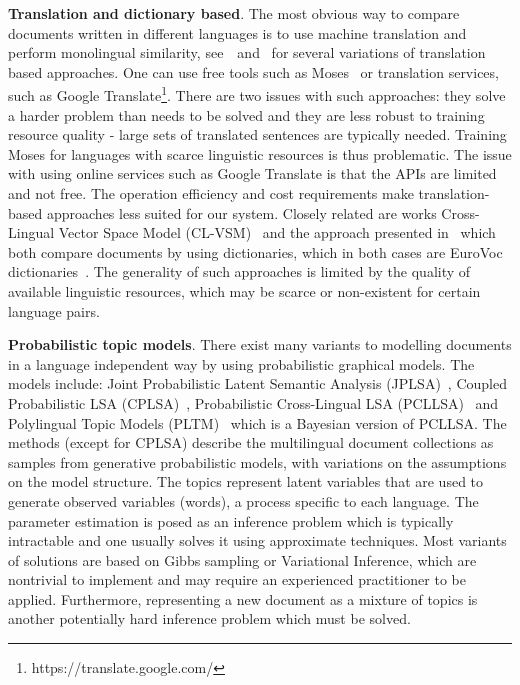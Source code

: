 \textbf{Translation and dictionary based}. The most obvious way to compare documents written in different languages is to use machine translation and perform monolingual similarity, see~\cite{multilingualBook}~and~\cite{plagiarism} for several variations of translation based approaches. One can use free tools such as Moses~\cite{moses} or translation services, such as Google Translate\footnote{https://translate.google.com/}. There are two issues with such approaches: they solve a harder problem than needs to be solved and they are less robust to training resource quality - large sets of translated sentences are typically needed. Training Moses for languages with scarce linguistic resources is thus problematic. The issue with using online services such as Google Translate is that the APIs are limited and not free. The operation efficiency and cost requirements make translation-based approaches less suited for our system. Closely related are works Cross-Lingual Vector Space Model (CL-VSM)~\cite{plagiarism} and the approach presented in~\cite{pouliquen2008story} which both compare documents by using dictionaries, which in both cases are EuroVoc dictionaries~\cite{eurovoc}. The generality of such approaches is limited by the quality of available linguistic resources, which may be scarce or non-existent for certain language pairs.

\textbf{Probabilistic topic models}. There exist many variants to modelling documents in a language independent way by using probabilistic graphical models. The models include:  Joint Probabilistic Latent Semantic Analysis (JPLSA)~\cite{platt2010translingual}, Coupled Probabilistic LSA (CPLSA)~\cite{platt2010translingual}, Probabilistic Cross-Lingual LSA (PCLLSA)~\cite{PCL_LSA} and Polylingual Topic Models (PLTM)~\cite{polyLDA} which is a Bayesian version of PCLLSA. The methods (except for CPLSA) describe the multilingual document collections as samples from generative probabilistic models, with variations on the assumptions on the model structure. The topics represent latent variables that are used to generate observed variables (words), a process specific to each language. The parameter estimation is posed as an inference problem which is typically intractable and one usually solves it using approximate techniques. Most variants of solutions are based on Gibbs sampling or Variational Inference, which are nontrivial to implement and may require an experienced practitioner to be applied. Furthermore, representing a new document as a mixture of topics is another potentially hard inference problem which must be solved.

